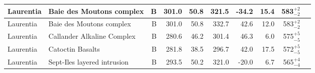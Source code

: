 \begin{longtable}{p{1 in}p{1 in}rrrrrrrp{1.5 in}}
                     Laurentia &                         Baie des Moutons complex &      B &     301.0 &      50.8 & 321.5 & -34.2 &      15.4 &      583$^{+2}_{-2}$ &                             \cite{McCausland2011a} \\ \hline
                     Laurentia &                         Baie des Moutons complex &      B &     301.0 &      50.8 & 332.7 &  42.6 &      12.0 &      583$^{+2}_{-2}$ &                             \cite{McCausland2011a} \\ \hline
                     Laurentia &                       Callander Alkaline Complex &      B &     280.6 &      46.2 & 301.4 &  46.3 &       6.0 &      575$^{+5}_{-5}$ &                                 \cite{Symons1991a} \\ \hline
                     Laurentia &                                 Catoctin Basalts &      B &     281.8 &      38.5 & 296.7 &  42.0 &      17.5 &      572$^{+5}_{-5}$ &                                  \cite{Meert1994a} \\ \hline
                     Laurentia &                      Sept-Iles layered intrusion &      B &     293.5 &      50.2 & 321.0 & -20.0 &       6.7 &      565$^{+4}_{-4}$ &                                 \cite{Tanczyk1987a} \\ \hline
\end{longtable}
